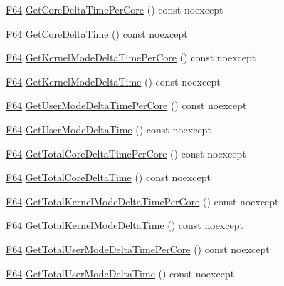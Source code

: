 \begin{DoxyCompactItemize}
\item 
\hyperlink{namespacemage_ad26233bbec640deda836e572c1a23708}{F64} \hyperlink{classmage_1_1_c_p_u_timer_a2b088ff4194fd2a5fd7201e8de4dd1da}{Get\+Core\+Delta\+Time\+Per\+Core} () const noexcept
\item 
\hyperlink{namespacemage_ad26233bbec640deda836e572c1a23708}{F64} \hyperlink{classmage_1_1_c_p_u_timer_a5d033c20772755d6a6693e1b495cf589}{Get\+Core\+Delta\+Time} () const noexcept
\item 
\hyperlink{namespacemage_ad26233bbec640deda836e572c1a23708}{F64} \hyperlink{classmage_1_1_c_p_u_timer_a7c503d9d66548e74ea29d887ee1ddcd3}{Get\+Kernel\+Mode\+Delta\+Time\+Per\+Core} () const noexcept
\item 
\hyperlink{namespacemage_ad26233bbec640deda836e572c1a23708}{F64} \hyperlink{classmage_1_1_c_p_u_timer_a806439a1ca61d81c877e9823b9cb0705}{Get\+Kernel\+Mode\+Delta\+Time} () const noexcept
\item 
\hyperlink{namespacemage_ad26233bbec640deda836e572c1a23708}{F64} \hyperlink{classmage_1_1_c_p_u_timer_a8838f9a875f227c6783e107986c0adfc}{Get\+User\+Mode\+Delta\+Time\+Per\+Core} () const noexcept
\item 
\hyperlink{namespacemage_ad26233bbec640deda836e572c1a23708}{F64} \hyperlink{classmage_1_1_c_p_u_timer_aa6873914da66a6be49ff69253f236f3e}{Get\+User\+Mode\+Delta\+Time} () const noexcept
\item 
\hyperlink{namespacemage_ad26233bbec640deda836e572c1a23708}{F64} \hyperlink{classmage_1_1_c_p_u_timer_af098c9df9e25e29beee131bb1de8c482}{Get\+Total\+Core\+Delta\+Time\+Per\+Core} () const noexcept
\item 
\hyperlink{namespacemage_ad26233bbec640deda836e572c1a23708}{F64} \hyperlink{classmage_1_1_c_p_u_timer_adb10ccea8664d1400d88953192a5a111}{Get\+Total\+Core\+Delta\+Time} () const noexcept
\item 
\hyperlink{namespacemage_ad26233bbec640deda836e572c1a23708}{F64} \hyperlink{classmage_1_1_c_p_u_timer_ab1128ed37f45445afdfc6d539d721616}{Get\+Total\+Kernel\+Mode\+Delta\+Time\+Per\+Core} () const noexcept
\item 
\hyperlink{namespacemage_ad26233bbec640deda836e572c1a23708}{F64} \hyperlink{classmage_1_1_c_p_u_timer_a38cb7adfd830f9d8c7a567f30ebcdf24}{Get\+Total\+Kernel\+Mode\+Delta\+Time} () const noexcept
\item 
\hyperlink{namespacemage_ad26233bbec640deda836e572c1a23708}{F64} \hyperlink{classmage_1_1_c_p_u_timer_a7eb10c5f750f03ad5e19f0b29ee4851c}{Get\+Total\+User\+Mode\+Delta\+Time\+Per\+Core} () const noexcept
\item 
\hyperlink{namespacemage_ad26233bbec640deda836e572c1a23708}{F64} \hyperlink{classmage_1_1_c_p_u_timer_aeff891594a11dba36c73442d04a430c8}{Get\+Total\+User\+Mode\+Delta\+Time} () const noexcept
\end{DoxyCompactItemize}
